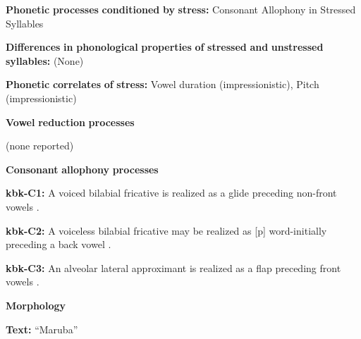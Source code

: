 \documentclass[output=paper]{langsci/langscibook}
\begin{document}
\begin{styleBody}
\textbf{Phonetic} \textbf{processes} \textbf{conditioned} \textbf{by} \textbf{stress:} Consonant Allophony in Stressed Syllables
\end{styleBody}

\begin{styleBody}
\textbf{Differences} \textbf{in} \textbf{phonological} \textbf{properties} \textbf{of} \textbf{stressed} \textbf{and} \textbf{unstressed} \textbf{syllables:} (None) 
\end{styleBody}

\begin{styleBody}
\textbf{Phonetic} \textbf{correlates} \textbf{of} \textbf{stress:} Vowel duration (impressionistic), Pitch (impressionistic)
\end{styleBody}

\begin{styleBody}
\textbf{Vowel} \textbf{reduction} \textbf{processes}
\end{styleBody}

\begin{styleBody}
(none reported)
\end{styleBody}

\begin{styleBody}
\textbf{Consonant} \textbf{allophony} \textbf{processes}
\end{styleBody}

\begin{styleBody}
\textbf{kbk-C1:} A voiced bilabial fricative is realized as a glide preceding non-front vowels \citep{Dutton1996}.
\end{styleBody}

\begin{styleBody}
\textbf{kbk-C2:} A voiceless bilabial fricative may be realized as [p] word-initially preceding a back vowel \citep{Dutton1996}.
\end{styleBody}

\begin{styleBody}
\textbf{kbk-C3:} An alveolar lateral approximant is realized as a flap preceding front vowels \citep{Dutton1996}.
\end{styleBody}

\begin{styleBody}
\textbf{Morphology}
\end{styleBody}

\begin{styleBody}
\textbf{Text:} “Maruba” \citep[72-76]{Dutton1996}
\end{styleBody}
\end{document}
